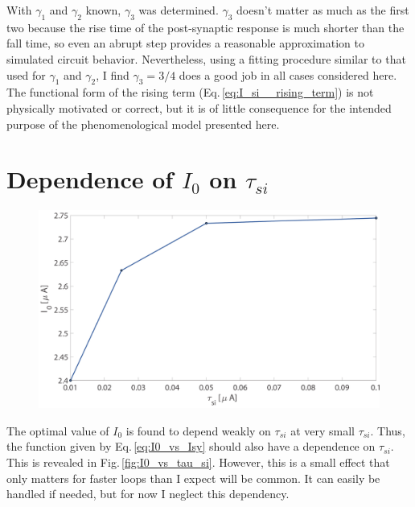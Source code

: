 \documentclass[]{article}
\begin{document}
With $\gamma_1$ and $\gamma_2$ known, $\gamma_3$ was determined. $\gamma_3$ doesn't matter as much as the first two because the rise time of the post-synaptic response is much shorter than the fall time, so even an abrupt step provides a reasonable approximation to simulated circuit behavior. Nevertheless, using a fitting procedure similar to that used for $\gamma_1$ and $\gamma_2$, I find $\gamma_3 = 3/4$ does a good job in all cases considered here. The functional form of the rising term (Eq.\,\ref{eq:I_si__rising_term}) is not physically motivated or correct, but it is of little consequence for the intended purpose of the phenomenological model presented here.

\section{\label{apx:dependence_of_I0_on_tau_si}Dependence of $I_0$ on $\tau_{si}$}
\begin{figure}[h!]
\centering
\includegraphics[width=17.2cm]{_I0_vs_tau_si.pdf}
\end{figure}
The optimal value of $I_0$ is found to depend weakly on $\tau_{si}$ at very small $\tau_{si}$. Thus, the function given by Eq.\,\ref{eq:I0_vs_Isy} should also have a dependence on $\tau_{si}$. This is revealed in Fig.\,\ref{fig:I0_vs_tau_si}. However, this is a small effect that only matters for faster loops than I expect will be common. It can easily be handled if needed, but for now I neglect this dependency.




\end{document}
